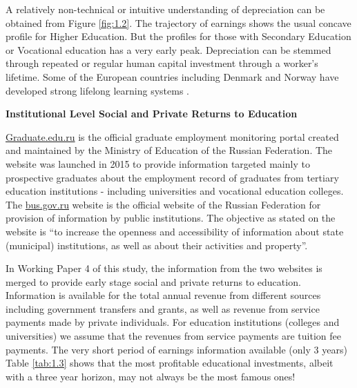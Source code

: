 \documentclass[alpha-refs]{wiley-article-04t}
\begin{document}
 A relatively non-technical or 
intuitive understanding of depreciation can be 
obtained from Figure \ref{fig:1.2}. The trajectory of earnings shows the 
usual 
concave profile for Higher Education. But the profiles for those with 
Secondary Education or Vocational education has a very early peak. 
Depreciation can be stemmed through  
repeated or regular human capital investment through a worker's lifetime. 
Some of the European countries including Denmark and Norway have developed 
strong lifelong learning systems 
\parencite{jorgensen2007,midtsundstad2019}. 

\hspace{-1.75em} \textbf{Institutional Level Social and Private Returns to 
Education}

\url{Graduate.edu.ru} is the official graduate employment monitoring portal 
created and maintained by the Ministry of Education of the Russian 
Federation. The website was launched in 2015 to provide information 
targeted mainly to prospective graduates about the employment record of 
graduates from tertiary education institutions - including universities and 
vocational education colleges. The \url{bus.gov.ru} website is the official 
website of the Russian Federation for provision of information by public 
institutions. The objective as stated on the website is ``to increase the 
openness and accessibility of information about state (municipal) 
institutions, as well as about their activities and property''. 

In Working Paper 4 of this study, the information from the two websites is 
merged to provide early stage social and private returns to education.  
Information is available for the total annual revenue from different 
sources including government transfers and grants, as well as revenue from 
service payments made by private individuals. For education institutions 
(colleges and universities) we assume that the revenues from service 
payments are tuition fee payments. The very short period of earnings 
information available (only 3 years) Table \ref{tab:1.3} shows 
that the most profitable educational investments, albeit with a three year 
horizon, may not always be the most famous ones! 
\end{document}
